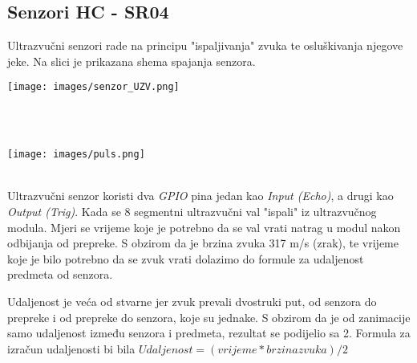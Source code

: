 \subsection{Senzori HC - SR04}
Ultrazvučni senzori rade na principu "ispaljivanja" zvuka te osluškivanja njegove jeke. Na slici je prikazana shema spajanja senzora.
\\[\intextsep]
\begin{minipage}{\linewidth}
\centering%
\texttt{[image: images/senzor\_UZV.png]}%
%
\label{fig:xfce}%
\end{minipage}
\\[\intextsep]
\newline
\\[\intextsep]
\begin{minipage}{\linewidth}
\centering%
\texttt{[image: images/puls.png]}%
%
\label{fig:xfce}%
\end{minipage}
\\[\intextsep]
Ultrazvučni senzor koristi dva \textit{GPIO} pina jedan kao \textit{Input (Echo)}, a drugi kao \textit{Output (Trig)}.
Kada se 8 segmentni ultrazvučni val "ispali" iz ultrazvučnog modula. Mjeri se vrijeme koje je potrebno da se val vrati natrag u modul nakon odbijanja od prepreke. S obzirom da je brzina zvuka 317 m/s (zrak), te vrijeme koje je bilo potrebno da se zvuk vrati  dolazimo do formule za udaljenost predmeta od senzora.
\newline

Udaljenost je veća od stvarne jer zvuk prevali dvostruki put, od senzora do prepreke i od prepreke do senzora, koje su jednake. S obzirom da je od zanimacije samo udaljenost između senzora i predmeta, rezultat se podijelio sa 2.
Formula za izračun udaljenosti bi bila
${Udaljenost=(vrijeme * brzina zvuka)/2}$
\newline
